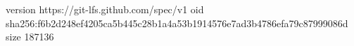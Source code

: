version https://git-lfs.github.com/spec/v1
oid sha256:f6b2d248ef4205ca5b445c28b1a4a53b1914576e7ad3b4786efa79c87999086d
size 187136
